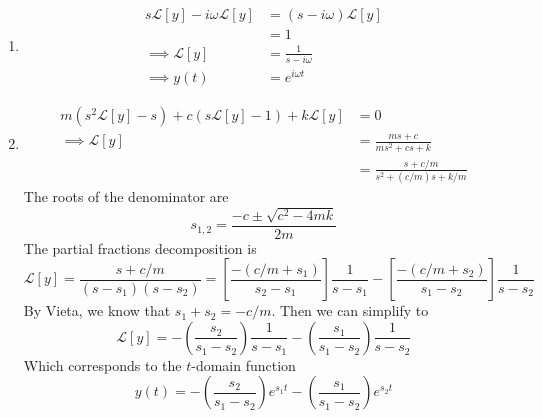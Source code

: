 \documentclass[a4paper]{article}
\begin{document}
\begin{enumerate}[label=(\alph*)]
\begin{align*}
										   & = \frac{6}{s^{2}} \\
	\implies \mathcal{L}\!\left[ y \right] & = \frac{6}{s^{2}\!\left( s^{2} + 1 \right)} \\ 
					       & = \frac{6}{s^{2}} + \frac{3i}{s - i} - \frac{3i}{s + i} \\
		 \implies y \!\left( t \right) & = 6t + 3ie^{it} - 3ie^{-it} \\
					       & = 6t - 6 \sin\!\left(t\right) 
	\end{align*}
	\item \begin{align*}
		s \mathcal{L}\!\left[ y \right] - i \omega \mathcal{L}\!\left[ y \right] & = \!\left( s - i \omega \right) \mathcal{L}\!\left[ y \right] \\
		 & = 1 \\ 
	\implies \mathcal{L}\!\left[ y \right] & = \frac{1}{s - i \omega} \\
	\implies y \!\left( t \right) & = e^{i \omega t}
	\end{align*}
	\item \begin{align*}
		m \!\left( s^{2}\mathcal{L}\!\left[ y \right] - s \right) + c \!\left( s \mathcal{L}\!\left[ y \right] - 1 \right) + k \mathcal{L}\!\left[ y \right] & = 0 \\
		\implies \mathcal{L}\!\left[ y \right] & = \frac{ms + c}{ms^{2} + cs + k} \\ 
		 & = \frac{s + c / m}{s^{2} + \!\left( c / m \right)s + k / m}
	\end{align*}
	The roots of the denominator are
	\[
		s_{1,2} = \frac{-c \pm \sqrt{c^{2} - 4mk}}{2m} 
	\]
	The partial fractions decomposition is
	\[
		\mathcal{L}\!\left[ y \right] = \frac{s + c/m}{\!\left( s - s_{1} \right)\!\left( s - s_{2} \right)} = \!\left[ \frac{-\!\left( c/m + s_{1} \right)}{s_{2} - s_{1}} \right] \frac{1}{s - s_{1}} - \!\left[ \frac{-\!\left( c/m + s_{2} \right)}{s_{1} - s_{2}} \right]\frac{1}{s - s_{2}}
	\]
	By Vieta, we know that \( s_{1} + s_{2} = -c/m \). Then we can simplify to
	\[
		\mathcal{L}\!\left[ y \right] = -\!\left( \frac{s_{2}}{s_{1} - s_{2}} \right)\frac{1}{s - s_{1}} - \!\left( \frac{s_{1}}{s_{1} - s_{2}} \right)\frac{1}{s - s_{2}} 
	\]
	Which corresponds to the \( t \)-domain function
	\[
		y \!\left( t \right) = -\!\left( \frac{s_{2}}{s_{1} - s_{2}} \right)e^{s_{1}t} - \!\left( \frac{s_{1}}{s_{1} - s_{2}} \right)e^{s_{2}t}
	\]
\end{enumerate}

\end{document}
